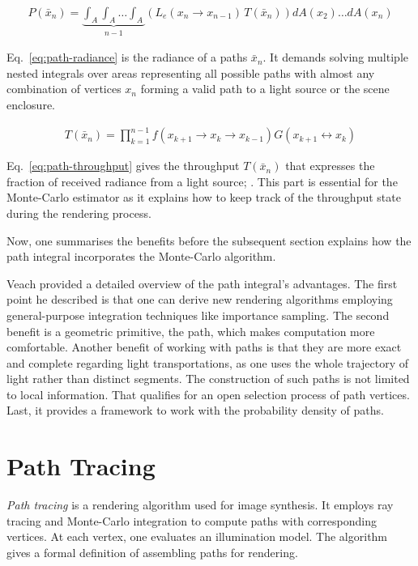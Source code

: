 \begin{align}
    P(\bar{x}_n)=\underbrace{\int_A \int_A \dots \int_A}_{n-1}\left(L_e(x_n\rightarrow x_{n-1})\,T(\bar{x}_n) \right)dA(x_2)\dotso dA(x_n)
    \label{eq:path-radiance}
\end{align}

Eq.~\ref{eq:path-radiance} is the radiance of a paths $\bar{x}_n$.
It demands solving multiple nested integrals over areas representing all possible paths with almost any combination of vertices $x_n$ forming a valid path to a light source or the scene enclosure.

\begin{align}
    T(\bar{x}_n)=\prod_{k=1}^{n-1}f(x_{k+1}\rightarrow x_k\rightarrow x_{k-1})G(x_{k+1}\leftrightarrow x_{k})
    \label{eq:path-throughput}
\end{align}

Eq.~\ref{eq:path-throughput} gives the throughput $T(\bar{x}_n)$ that expresses the fraction of received radiance from a light source; \cite{pharr_physically_2017}.
This part is essential for the Monte-Carlo estimator as it explains how to keep track of the throughput state during the rendering process.

Now, one summarises the benefits before the subsequent section explains how the path integral incorporates the Monte-Carlo algorithm.

Veach \cite{veach_robust_1997} provided a detailed overview of the path integral's advantages.
The first point he described is that one can derive new rendering algorithms employing general-purpose integration techniques like importance sampling.
The second benefit is a geometric primitive, the path, which makes computation more comfortable.
Another benefit of working with paths is that they are more exact and complete regarding light transportations, as one uses the whole trajectory of light rather than distinct segments.
The construction of such paths is not limited to local information.
That qualifies for an open selection process of path vertices.
Last, it provides a framework to work with the probability density of paths.

\section{Path Tracing} \label{sec:path-tracing}

\textit{Path tracing} is a rendering algorithm used for image synthesis.
It employs ray tracing and Monte-Carlo integration to compute paths with corresponding vertices.
At each vertex, one evaluates an illumination model.
The algorithm gives a formal definition of assembling paths for rendering.

